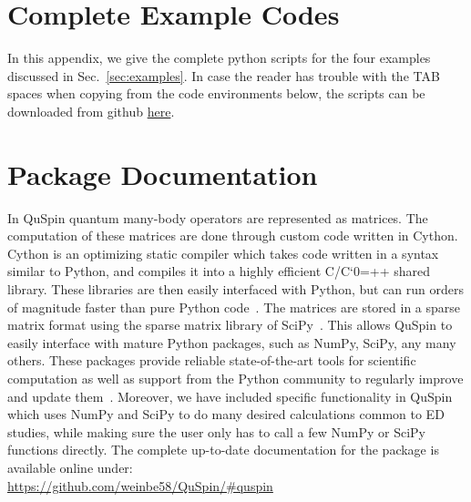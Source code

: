 \documentclass{SciPost}
\newcommand\0{\scalebox{-1}[1]{0}}
\let\svttfamily\ttfamily
\renewcommand\ttfamily{\svttfamily\catcode`0=\active }
\renewcommand\texttt{\bgroup\ttfamily\texttthelp}
\def\texttthelp#1{#1\egroup}
\begin{document}
\begin{appendix}
\newpage
\section{Complete Example Codes}
\label{app:scripts}

In this appendix, we give the complete python scripts for the four examples discussed in Sec.~\ref{sec:examples}. In case the reader has trouble with the TAB spaces when copying from the code environments below, the scripts can be downloaded from github \href{https://github.com/weinbe58/QuSpin/tree/master/examples}{here}.


\newpage

\newpage

\newpage



\section{Package Documentation}
\label{app:doc}
In QuSpin quantum many-body operators are represented as matrices. The computation of these matrices are done through custom code written in Cython. Cython is an optimizing static compiler which takes code written in a syntax similar to Python, and compiles it into a highly efficient C/C\texttt{++} shared library. These libraries are then easily interfaced with Python, but can run orders of magnitude faster than pure Python code~\cite{Cython}. The matrices are stored in a sparse matrix format using the sparse matrix library of SciPy~\cite{SciPy_package}. This allows QuSpin to easily interface with mature Python packages, such as NumPy, SciPy, any many others. These packages provide reliable state-of-the-art tools for scientific computation as well as support from the Python community to regularly improve and update them~\cite{NumPy,Python_computing_1,Python_computing_2,SciPy_package}. Moreover, we have included specific functionality in QuSpin which uses NumPy and SciPy to do many desired calculations common to ED studies, while making sure the user only has to call a few NumPy or SciPy functions directly. The complete up-to-date documentation for the package is available online under:\\

\href{https://github.com/weinbe58/QuSpin/#quspin}{https://github.com/weinbe58/QuSpin/\#quspin}\\

\end{appendix}
\end{document}
